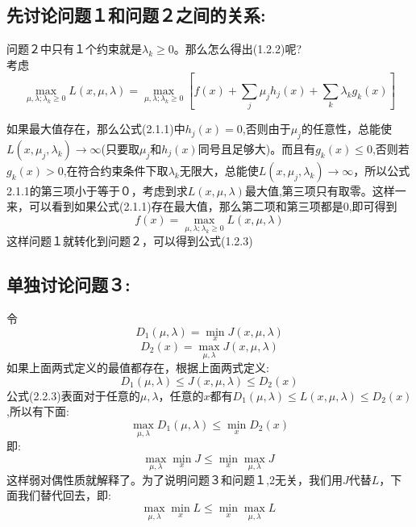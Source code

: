 \documentclass{article}
\begin{document}
\subsection{先讨论问题１和问题２之间的关系:}
问题２中只有１个约束就是$\lambda_k \ge 0$。那么怎么得出(1.2.2)呢?\\
考虑
\begin{equation}
\max_{\mu,\lambda;\lambda_k\ge 0}L(x,\mu,\lambda)=\max_{\mu,\lambda;\lambda_k\ge 0}[f(x)+\sum_j\mu_jh_j(x)+\sum_k\lambda_kg_k(x)] \tag{2.1.1}
\end{equation}

如果最大值存在，那么公式(2.1.1)中$h_j(x)=0$,否则由于$\mu_j$的任意性，总能使$L(x,\mu_j,\lambda_k)\rightarrow \infty$(只要取$\mu_j$和$h_j(x)$同号且足够大)。而且有$g_k(x)\le 0$,否则若$g_k(x)>0$,在符合约束条件下取$\lambda_k$无限大，总能使$L(x,\mu_j,\lambda_k)\rightarrow \infty$，所以公式2.1.1的第三项小于等于０，考虑到求$L(x,\mu,\lambda)$最大值,第三项只有取零。这样一来，可以看到如果公式(2.1.1)存在最大值，那么第二项和第三项都是0,即可得到
\begin{equation}
f(x)=\max_{\mu,\lambda;\lambda_k \ge 0}L(x,\mu,\lambda) \tag{2.2.2}
\end{equation}
这样问题１就转化到问题２，可以得到公式(1.2.3)
\\
\subsection{单独讨论问题３:}
令
\begin{equation}
D_1(\mu,\lambda)=\min_xJ(x,\mu,\lambda) \tag{2.2.1}
\end{equation}
\begin{equation}
D_2(x)=\max_{\mu,\lambda}J(x,\mu,\lambda) \tag{2.2.2}
\end{equation}
如果上面两式定义的最值都存在，根据上面两式定义:
\begin{equation}
D_1(\mu,\lambda) \le J(x,\mu,\lambda) \le D_2(x) \tag{2.2.3}
\end{equation}
公式(2.2.3)表面对于任意的$\mu,\lambda$，任意的$x$都有$D_1(\mu,\lambda) \le L(x,\mu,\lambda) \le D_2(x)$,所以有下面:
\begin{equation}
\max_{\mu,\lambda}D_1(\mu,\lambda) \le \min_{x}D_2(x) \tag{2.2.4}
\end{equation}
即:
\begin{equation}
\max_{\mu,\lambda}\min_xJ\le \min_x\max_{\mu,\lambda}J\ \tag{2.2.5}
\end{equation}
这样弱对偶性质就解释了。为了说明问题３和问题１,2无关，我们用$J$代替$L$，下面我们替代回去，即:
\begin{equation}
\max_{\mu,\lambda}\min_xL\le \min_x\max_{\mu,\lambda}L\ \tag{2.2.5}
\end{equation}\\
\end{document}
